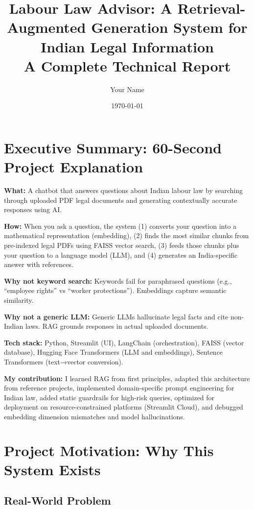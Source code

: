 \documentclass[11pt,a4paper]{article}
\title{\textbf{Labour Law Advisor: A Retrieval-Augmented Generation System for Indian Legal Information}\\
\large{A Complete Technical Report}}
\author{Your Name}
\date{\today}
\begin{document}
\maketitle
\tableofcontents
\newpage

\section{Executive Summary: 60-Second Project Explanation}

\textbf{What:} A chatbot that answers questions about Indian labour law by searching through uploaded PDF legal documents and generating contextually accurate responses using AI.

\textbf{How:} When you ask a question, the system (1) converts your question into a mathematical representation (embedding), (2) finds the most similar chunks from pre-indexed legal PDFs using FAISS vector search, (3) feeds those chunks plus your question to a language model (LLM), and (4) generates an India-specific answer with references.

\textbf{Why not keyword search:} Keywords fail for paraphrased questions (e.g., ``employee rights'' vs ``worker protections''). Embeddings capture semantic similarity.

\textbf{Why not a generic LLM:} Generic LLMs hallucinate legal facts and cite non-Indian laws. RAG grounds responses in actual uploaded documents.

\textbf{Tech stack:} Python, Streamlit (UI), LangChain (orchestration), FAISS (vector database), Hugging Face Transformers (LLM and embeddings), Sentence Transformers (text→vector conversion).

\textbf{My contribution:} I learned RAG from first principles, adapted this architecture from reference projects, implemented domain-specific prompt engineering for Indian law, added static guardrails for high-risk queries, optimized for deployment on resource-constrained platforms (Streamlit Cloud), and debugged embedding dimension mismatches and model hallucinations.

\section{Project Motivation: Why This System Exists}

\subsection{Real-World Problem}
\end{document}
